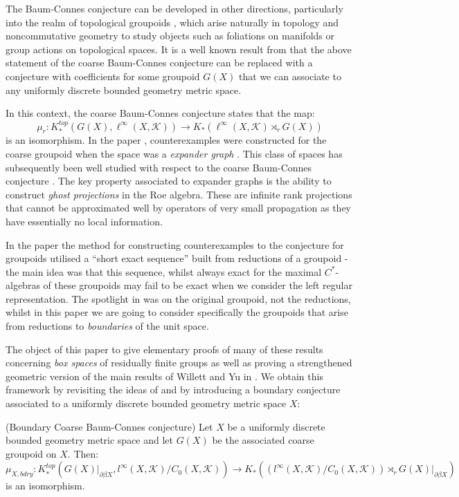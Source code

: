 The Baum-Connes conjecture can be developed in other directions, particularly into the realm of topological groupoids \cite{MR1798599}, which arise naturally in topology and noncommutative geometry to study objects such as foliations on manifolds or group actions on topological spaces. It is a well known result from \cite{MR1905840} that the above statement of the coarse Baum-Connes conjecture can be replaced with a conjecture with coefficients for some groupoid $G(X)$ that we can associate to any uniformly discrete bounded geometry metric space.

In this context, the coarse Baum-Connes conjecture states that the map:
\begin{equation*}
\mu_{r}:K_{*}^{top}(G(X), \ell^{\infty}(X,\mathcal{K})) \rightarrow K_{*}(\ell^{\infty}(X,\mathcal{K})\rtimes_{r}G(X))
\end{equation*}
is an isomorphism. In the paper \cite{MR1911663}, counterexamples were constructed for the coarse groupoid when the space was a \textit{expander graph} \cite{MR2569682}. This class of spaces has subsequently been well studied with respect to the coarse Baum-Connes conjecture \cite{higsonpreprint,MR2431253,MR2419930,MR2764895,MR2568691,explg1,explg2}. The key property associated to expander graphs is the ability to construct \textit{ghost projections} in the Roe algebra. These are infinite rank projections that cannot be approximated well by operators of very small propagation as they have essentially no local information. 

In the paper \cite{MR1911663} the method for constructing counterexamples to the conjecture for groupoids utilised a ``short exact sequence'' built from reductions of a groupoid -the main idea was that this sequence, whilst always exact for the maximal $C^{*}$-algebras of these groupoids may fail to be exact when we consider the left regular representation. The spotlight in \cite{MR1911663} was on the original groupoid, not the reductions, whilst in this paper we are going to consider specifically the groupoids that arise from reductions to \textit{boundaries} of the unit space. 

The object of this paper to give elementary proofs of many of these results concerning \textit{box spaces} of residually finite groups as well as proving a strengthened geometric version of the main results of Willett and Yu in \cite{explg1,explg2}. We obtain this framework by revisiting the ideas of \cite{MR1911663,MR1905840} and by introducing a boundary conjecture associated to a uniformly discrete bounded geometry metric space $X$:
\begin{conjecture}(Boundary Coarse Baum-Connes conjecture)\label{MC:S1}
Let $X$ be a uniformly discrete bounded geometry metric space and let $G(X)$ be the associated coarse groupoid on $X$. Then:
\begin{equation*}
\mu_{X,bdry}:K_{*}^{top}(G(X)|_{\partial\beta X}, l^{\infty}(X,\mathcal{K})/C_{0}(X,\mathcal{K})) \rightarrow K_{*}((l^{\infty}(X,\mathcal{K})/C_{0}(X,\mathcal{K}))\rtimes_{r}G(X)|_{\partial\beta X})
\end{equation*}
is an isomorphism.
\end{conjecture}

